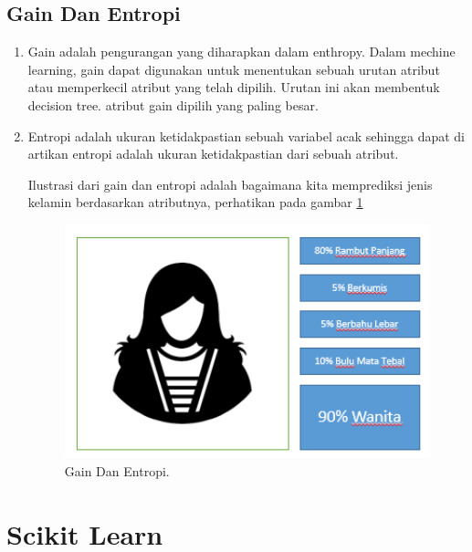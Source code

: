\subsection{Gain Dan Entropi}
\begin{enumerate}
\item Gain adalah pengurangan yang diharapkan dalam enthropy. Dalam mechine learning, gain dapat digunakan untuk menentukan sebuah urutan atribut atau memperkecil atribut yang telah dipilih. Urutan ini akan membentuk decision tree. atribut gain dipilih yang paling besar.

\item Entropi adalah ukuran ketidakpastian sebuah variabel acak sehingga dapat di artikan entropi adalah ukuran ketidakpastian dari sebuah atribut.

\subitem Ilustrasi dari gain dan entropi adalah bagaimana kita memprediksi jenis kelamin berdasarkan atributnya, perhatikan pada gambar \ref{YNGE}

		\begin{figure}[ht]
		\centerline{\includegraphics[width=1\textwidth]{figures/YN/YN57.png}}
		\caption{Gain Dan Entropi.}
		\label{YNGE}
		\end{figure}
\end{enumerate}

\section{Scikit Learn}

